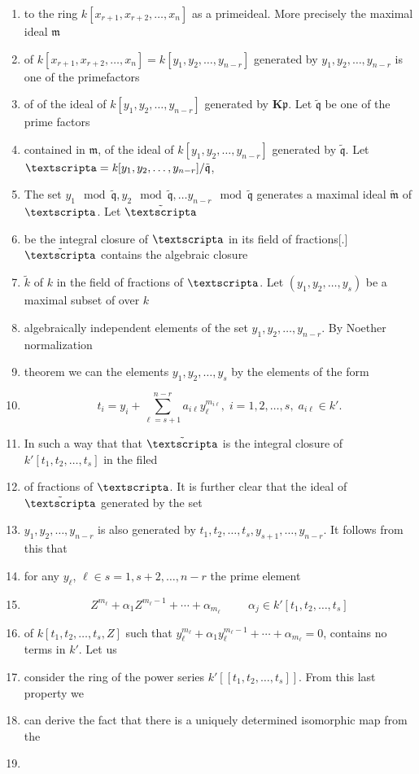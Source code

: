 \documentclass[12pt]{amsart}
\begin{document}
\begin{enumerate}
\item
to the ring $\mathit{k}[x_{r+1},x_{r+2},\dots,x_n]$ as a primeideal. More precisely the maximal ideal $\mathfrak{m}$
\item
of $\mathit{k}[x_{r+1},x_{r+2},\dots,x_n]=\mathit{k}[y_1,y_2,\dots,y_{n-r}]$ generated by $y_1,y_2,\dots,y_{n-r}$ is one of the primefactors
\item
of of the ideal of $\mathit{k}[y_1,y_2,\dots,y_{n-r}]$ generated by $\mathbf{K}{\mathfrak{p}}$. Let $\tilde{\mathfrak{q}}$ be one of the prime factors
\item
contained in $\mathfrak{m}$, of the ideal of $\mathit{k}[y_1,y_2,\dots,y_{n-r}]$ generated by $\tilde{\mathfrak{q}}$.
Let  ${\mbox{\textscripta}}=\mathit{k}[y_1,y_2,\dots,y_{n-r}]/\tilde{\mathfrak{q}}$,
\item
The set $y_1 \mod \tilde{\mathfrak{q}}, y_2 \mod \tilde{\mathfrak{q}}, \dots y_{n-r}\mod \tilde{\mathfrak{q}}$ generates a maximal ideal $\tilde{\mathfrak{m}}$ of ${\mbox{\textscripta}}$. Let $\tilde{\mbox{\textscripta}}$
\item
be the integral closure of ${\mbox{\textscripta}}$ in its field of fractions[.] $\tilde{\mbox{\textscripta}}$ contains the algebraic closure
\item
$\tilde{\mathit{k}}$ of $\mathit{k}$ in the field of fractions of ${\mbox{\textscripta}}$. Let $(y_1,y_2,\dots,y_s)$ be a maximal subset of over $\mathit{k}$
\item
algebraically independent elements of the set $y_1,y_2,\dots,y_{n-r}$. By Noether normalization
\item
theorem we can the elements $y_1,y_2,\dots, y_s$ by the elements of the form
\item
\[ t_i=y_i+\sum_{\ell=s+1}^{n-r}a_{i\ell}y_{\ell}^{m_{i\ell}}, \; i=1,2,\dots,s, \; a_{i\ell}\in \mathit{k}'.  \]
\item
In such a way that that $\tilde{\mbox{\textscripta}}$ is the integral closure of $\mathit{k}'[t_1,t_2,\dots,t_s]$ in the filed
\item
of fractions of ${\mbox{\textscripta}}$. It is further clear that the ideal of $\tilde{\mbox{\textscripta}}$ generated by the set
\item
$y_1,y_2,\dots,y_{n-r}$ is also generated by $t_1,t_2,\dots,t_s,y_{s+1},\dots,y_{n-r}$. It follows from this that
\item
for any $y_{\ell}$, $\ell\in s=1,s+2,\dots,n-r$ the prime element
\item
\[ Z^{m_{\ell}}+\alpha_1Z^{m_{\ell}-1}+\cdots+\alpha_{m_{\ell}} \hspace{1cm} \alpha_j\in\mathit{k}'[t_1,t_2,\dots,t_s] \]
\item
of $\mathit{k}[t_1,t_2,\dots,t_s,Z]$ such that $y_{\ell}^{m_{\ell}}+\alpha_1y_{\ell}^{m_{\ell}-1}+\cdots+\alpha_{m_{\ell}}=0$, contains no terms in $\mathit{k}'$. Let us
\item
consider the ring of the power series $\mathit{k}'[[t_1,t_2,\dots,t_s]]$. From this last property we
\item
can derive the fact that there is a uniquely determined isomorphic map from the
\item


\end{enumerate}
\end{document}
